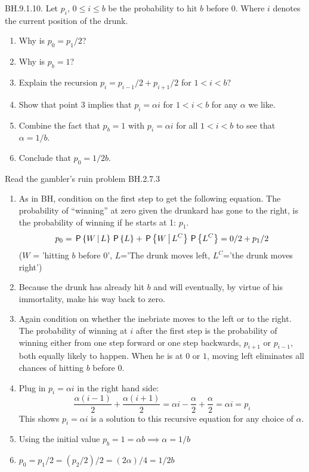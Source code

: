 \begin{exercise}
  BH.9.1.10.  Let $p_i$, $0\leq i\leq b$ be the probability to hit $b$ before $0$. Where $i$ denotes the current position of the drunk.
\begin{enumerate}
\item Why is $p_0=p_1/2$?
\item Why is $p_{b}=1$?
\item Explain the recursion $p_i=p_{i-1}/2 + p_{i+1}/2$ for $1 < i <b$?
\item Show that point $3$ implies that $p_i =  \alpha i$ for $1<i<b$ for any $\alpha$ we like.
\item Combine the fact that $p_{b}=1$ with $p_{i} = \alpha i$ for all $1<i<b$ to see that $\alpha=1/b$.
\item Conclude that $p_0=1/2b$.
\end{enumerate}
\begin{hint}
  Read the gambler's ruin problem BH.2.7.3
\end{hint}

\begin{solution}
  \begin{enumerate}
    \item As in BH, condition on the first step to get the following equation. The probability of ``winning'' at zero given the drunkard has gone to the right, is the probability of winning if he starts at 1: $p_1$.
      \[p_0 = \,\mathsf{P}\left\{W \,\middle|\, L\right\} \,\mathsf{P}\left\{L\right\} + \,\mathsf{P}\left\{W\,\middle|\, L^C\right\} \,\mathsf{P}\left\{L^C\right\} = 0/2 +p_1/2 \]
      ($W$ = 'hitting $b$ before $0$', $L$='The drunk moves left, $L^C$='the drunk moves right') 
    \item Because the drunk has already hit $b$ and will eventually, by virtue of his immortality, make his way back to zero.
    \item Again condition on whether the inebriate moves to the left or to the right. The probability of winning at $i$ after the first step is the probability of winning either from one step forward or one step backwards, $p_{i+1}$ or $p_{i-1}$, both equally likely to happen. 
      When he is at $0$ or $1$, moving left eliminates all chances of hitting $b$ before $0$.
    \item Plug in $p_i = \alpha i$ in the right hand side: 
      \begin{equation*}
	\frac{\alpha(i-1)}{2} + \frac{\alpha(i+1)}{2} = \alpha i - \frac{\alpha}{2} + \frac{\alpha}{2} = \alpha i = p_i
      \end{equation*}
    This shows $p_i = \alpha i$ is a solution to this recursive equation for any choice of $\alpha$. 
    \item Using the initial value $ p_b = 1 = \alpha b \implies \alpha = 1/b $ 
    \item $ p_0 = p_1 / 2 = (p_2/2)/2 = (2\alpha)/4 = 1/2b$ 
  \end{enumerate}
  

\end{solution}
\end{exercise}
